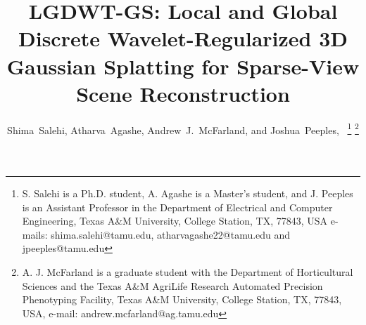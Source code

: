 \documentclass[lettersize,journal]{IEEEtran}
\begin{document}





\title{LGDWT-GS: Local and Global Discrete Wavelet-Regularized 3D Gaussian Splatting for Sparse-View Scene Reconstruction}

\author{%
Shima~Salehi, 
Atharva~Agashe, 
Andrew~J.~McFarland, 
and Joshua~Peeples,~%
\thanks{S. Salehi is a Ph.D. student, A. Agashe is a Master's student, and J. Peeples is an Assistant Professor in the Department of Electrical and Computer Engineering, Texas A\&M University, College Station, TX, 77843, USA e-mails: shima.salehi@tamu.edu, atharvagashe22@tamu.edu and jpeeples@tamu.edu }%
\thanks{A. J. McFarland is a graduate student with the Department of Horticultural Sciences and the Texas A\&M AgriLife Research Automated Precision Phenotyping Facility, Texas A\&M University, College Station, TX, 77843, USA, e-mail: andrew.mcfarland@ag.tamu.edu}%
}
\end{document}
